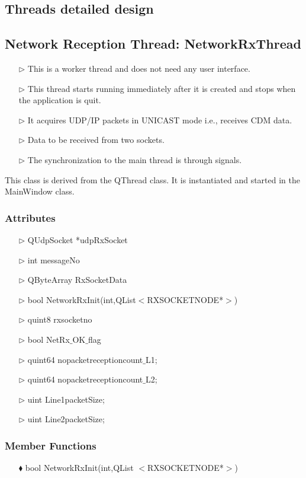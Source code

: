 \begin{enumerate}
\section{Threads detailed design}

\subsection{Network Reception Thread: NetworkRxThread} \label{NtWkRxThd}
\begin{enumerate}
	\item [$\rhd$] This is a worker thread and does not need any user interface.
	\item [$\rhd$] This thread starts running immediately after it is created and stops when the application is quit.
	\item [$\rhd$] It acquires UDP/IP packets in UNICAST mode i.e., receives CDM data.
	\item [$\rhd$] Data to be received from two sockets.
	\item [$\rhd$] The synchronization to the main thread is through signals.
\end{enumerate}
This class is derived from the QThread class. It is instantiated and started in the MainWindow class.
\subsubsection{Attributes}
\begin{enumerate}
	\item [$\rhd$] QUdpSocket *udpRxSocket
	\item [$\rhd$] int messageNo
	\item [$\rhd$] QByteArray RxSocketData
	\item [$\rhd$] bool NetworkRxInit(int,QList$<$RXSOCKETNODE*$>$)
	\item [$\rhd$] quint8 rxsocketno
	\item [$\rhd$] bool NetRx$\_$OK$\_$flag
	\item [$\rhd$] quint64 nopacketreceptioncount$\_$L1;
	\item [$\rhd$] quint64 nopacketreceptioncount$\_$L2;
	\item [$\rhd$] uint Line1packetSize;
	\item [$\rhd$] uint Line2packetSize;
\end{enumerate}

\subsubsection{Member Functions }
\begin{enumerate}
	\item [$\blacklozenge$] bool NetworkRxInit(int,QList $<$RXSOCKETNODE*$>$)
\end{enumerate}



\end{enumerate}

